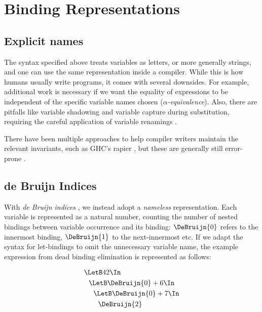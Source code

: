 \chapter{Binding Representations}
\label{ch:binding-representation}

\section{Explicit names}
\label{sec:binding-representation-names}
The syntax specified above treats variables as letters, or more generally strings,
and one can use the same representation inside a compiler.
While this is how humans usually write programs, it comes with several downsides.
For example, additional work is necessary
if we want the equality of expressions to be independent of the specific variable names chosen
(\emph{$\alpha$-equivalence}).
Also, there are pitfalls like variable shadowing and variable capture during substitution,
requiring the careful application of variable renamings
\cite{Barendregt1985LambdaCalculus}.

There have been multiple approaches to help compiler writers maintain the relevant invariants,
such as GHC's rapier \cite{Jones2002GHCInliner},
but these are generally still error-prone
\cite{Maclaurin2022Foil}.

\section{de Bruijn Indices}
\label{sec:binding-representation-de-bruijn}

With \emph{de Bruijn indices}
\cite{DeBruijn1972NamelessIndices},
we instead adopt a \emph{nameless} representation.
Each variable is represented as a natural number,
counting the number of nested bindings between variable occurrence and its binding:
$\DeBruijn{0}$ refers to the innermost binding, $\DeBruijn{1}$ to the next-innermost etc.
If we adapt the syntax for let-bindings to omit the unnecessary variable name,
the example expression from dead binding elimination is represented as follows:

\begin{align*}
  &\LetB 42 \In                       \\
  &\ \ \LetB \DeBruijn{0} + 6 \In     \\
  &\ \ \ \ \LetB \DeBruijn{0} + 7 \In \\
  &\ \ \ \ \ \ \DeBruijn{2}
\end{align*}

